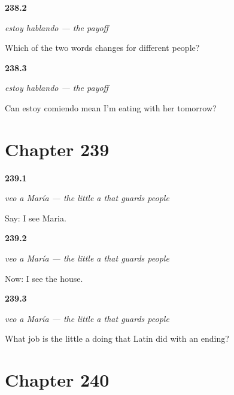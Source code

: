 \noindent\begin{minipage}[t]{\linewidth}
\raggedright
\hypertarget{review-ES-C62-estoy-hablando-which}{\textbf{238.2}} \emph{estoy hablando — the payoff}\par
\small Which of the two words changes for different people?
\end{minipage}\par\medskip

\noindent\begin{minipage}[t]{\linewidth}
\raggedright
\hypertarget{review-ES-C62-estoy-hablando-future}{\textbf{238.3}} \emph{estoy hablando — the payoff}\par
\small Can estoy comiendo mean I'm eating with her tomorrow?
\end{minipage}\par\medskip

\section*{Chapter 239}

\noindent\begin{minipage}[t]{\linewidth}
\raggedright
\hypertarget{review-ES-C62-veo-a-maria-person}{\textbf{239.1}} \emph{veo a María — the little a that guards people}\par
\small Say: I see Maria.
\end{minipage}\par\medskip

\noindent\begin{minipage}[t]{\linewidth}
\raggedright
\hypertarget{review-ES-C62-veo-a-maria-thing}{\textbf{239.2}} \emph{veo a María — the little a that guards people}\par
\small Now: I see the house.
\end{minipage}\par\medskip

\noindent\begin{minipage}[t]{\linewidth}
\raggedright
\hypertarget{review-ES-C62-veo-a-maria-why}{\textbf{239.3}} \emph{veo a María — the little a that guards people}\par
\small What job is the little a doing that Latin did with an ending?
\end{minipage}\par\medskip

\section*{Chapter 240}

